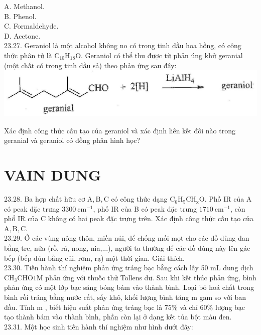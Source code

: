\documentclass[10pt]{article}
\begin{document}
A. Methanol.\\
B. Phenol.\\
C. Formaldehyde.\\
D. Acetone.\\
23.27. Geraniol là một alcohol không no có trong tinh dầu hoa hồng, có công thức phân tử là $\mathrm{C}_{10} \mathrm{H}_{18} \mathrm{O}$. Geraniol có thể thu được từ phản úng khử geranial (một chất có trong tinh dầu sả) theo phản ứng sau đây:\\
\includegraphics[max width=\textwidth, center]{2025_10_23_fa9073eecee116ad8cf2g-81(4)}

Xác định công thức cấu tạo của geraniol và xác định liên kết đôi nào trong geranial và geraniol có đồng phân hình học?

\section*{VAIN DUNG}
23.28. Ba hợp chất hữu cơ $\mathrm{A}, \mathrm{B}, \mathrm{C}$ có công thức dạng $\mathrm{C}_{6} \mathrm{H}_{5} \mathrm{CH}_{\mathrm{x}} \mathrm{O}$. Phồ IR của A có peak đặc trưng $3300 \mathrm{~cm}^{-1}$, phố IR của B có peak đặc trưng $1710 \mathrm{~cm}^{-1}$, còn phổ IR của C không có hai peak đặc trưng trên. Xác định công thức cấu tạo của $\mathrm{A}, \mathrm{B}, \mathrm{C}$.\\
23.29. Ở các vùng nông thôn, miền núi, để chống mối mọt cho các đồ dùng đan bằng tre, nứa (rồ, rá, nong, nia,...), người ta thường để các đồ dùng này lên gác bếp (bếp đún bằng củi, rơm, rạ) một thời gian. Giải thích.\\
23.30. Tiến hành thí nghiệm phản ứng tráng bạc bằng cách lấy 50 mL dung dịch $\mathrm{CH}_{3} \mathrm{CHO} 1 \mathrm{M}$ phản ứng với thuốc thử Tollens dư. Sau khi kết thúc phản ứng, bình phản ứng có một lớp bạc sáng bóng bám vào thành bình. Loại bỏ hoá chất trong bình rồi tráng bằng nước cất, sấy khô, khối lượng bình tăng m gam so với ban đầu. Tính m , biết hiệu suất phản ứng tráng bạc là $75 \%$ và chỉ $60 \%$ lượng bạc tạo thành bám vào thành bình, phần còn lại ở dạng kết tủa bột màu đen.\\
23.31. Một học sinh tiến hành thí nghiệm như hình dưới đây:
\end{document}
